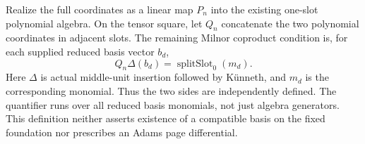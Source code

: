 \begin{definition}
  \label{def:h6-milnor-coproduct-input}
  \leanok
  Realize the full coordinates as a linear map $P_n$ into the existing
  one-slot polynomial algebra. On the tensor square, let $Q_n$ concatenate
  the two polynomial coordinates in adjacent slots. The remaining Milnor
  coproduct condition is, for each supplied reduced basis vector $b_d$,
  \[
    Q_n\Delta(b_d)=\operatorname{splitSlot}_0(m_d).
  \]
  Here $\Delta$ is actual middle-unit insertion followed by K\"unneth,
  and $m_d$ is the corresponding monomial. Thus the two sides are
  independently defined. The quantifier runs over all reduced basis
  monomials, not just algebra generators. This definition neither asserts
  existence of a compatible basis on the fixed foundation nor prescribes
  an Adams page differential.
\end{definition}

